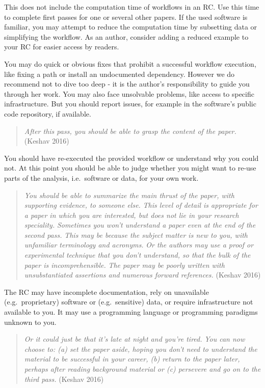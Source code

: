 \documentclass[fleqn,10pt]{wlpeerj} %
\begin{document}
This does not include the computation time of workflows in an RC. Use
this time to complete first passes for one or several other papers. If
the used software is familiar, you may attempt to reduce the computation
time by subsetting data or simplifying the workflow. As an author,
consider adding a reduced example to your RC for easier access by
readers.

You may do quick or obvious fixes that prohibit a successful workflow
execution, like fixing a path or install an undocumented dependency.
However we do recommend not to dive too deep - it is the author's
responsibility to guide you through her work. You may also face
unsolvable problems, like access to specific infrastructure. But you
should report issues, for example in the software's public code
repository, if available.

\begin{quote}
\emph{After this pass, you should be able to grasp the content of the
paper.} (Keshav 2016)
\end{quote}

You should have re-executed the provided workflow or understand why you
could not. At this point you should be able to judge whether you might
want to re-use parts of the analysis, i.e.~software or data, for your
own work.

\begin{quote}
\emph{You should be able to summarize the main thrust of the paper, with
supporting evidence, to someone else.} \emph{This level of detail is
appropriate for a paper in which you are interested, but does not lie in
your research speciality.} \emph{Sometimes you won't understand a paper
even at the end of the second pass.} \emph{This may be because the
subject matter is new to you, with unfamiliar terminology and acronyms.}
\emph{Or the authors may use a proof or experimental technique that you
don't understand, so that the bulk of the paper is incomprehensible.}
\emph{The paper may be poorly written with unsubstantiated assertions
and numerous forward references.} (Keshav 2016)
\end{quote}

The RC may have incomplete documentation, rely on unavailable
(e.g.~proprietary) software or (e.g.~sensitive) data, or require
infrastructure not available to you. It may use a programming language
or programming paradigms unknown to you.

\begin{quote}
\emph{Or it could just be that it's late at night and you're tired.}
\emph{You can now choose to: (a) set the paper aside, hoping you don't
need to understand the material to be successful in your career, (b)
return to the paper later, perhaps after reading background material or
(c) persevere and go on to the third pass.} (Keshav 2016)
\end{quote}
\end{document}
